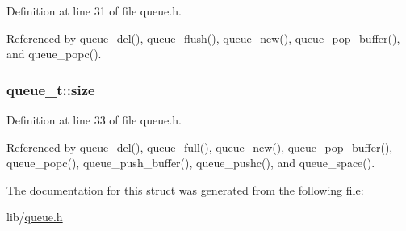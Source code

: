 Definition at line 31 of file queue.\-h.



Referenced by queue\-\_\-del(), queue\-\_\-flush(), queue\-\_\-new(), queue\-\_\-pop\-\_\-buffer(), and queue\-\_\-popc().

\hypertarget{structqueue__t_a83a13b888f9d4ef127d706559818b779}{
\subsubsection[{size}]{ queue\-\_\-t\-::size}}\label{structqueue__t_a83a13b888f9d4ef127d706559818b779}


Definition at line 33 of file queue.\-h.



Referenced by queue\-\_\-del(), queue\-\_\-full(), queue\-\_\-new(), queue\-\_\-pop\-\_\-buffer(), queue\-\_\-popc(), queue\-\_\-push\-\_\-buffer(), queue\-\_\-pushc(), and queue\-\_\-space().



The documentation for this struct was generated from the following file\-:\begin{DoxyCompactItemize}
\item 
lib/\hyperlink{queue_8h}{queue.\-h}\end{DoxyCompactItemize}
